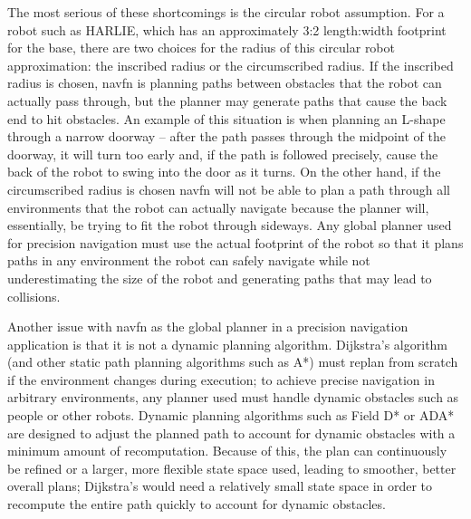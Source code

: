 The most serious of these shortcomings is the circular robot assumption. For a robot such as HARLIE, which has an approximately 3:2 length:width footprint for the base, there are two choices for the radius of this circular robot approximation: the inscribed radius or the circumscribed radius. If the inscribed radius is chosen, navfn is planning paths between obstacles that the robot can actually pass through, but the planner may generate paths that cause the back end to hit obstacles. An example of this situation is when planning an L-shape through a narrow doorway -- after the path passes through the midpoint of the doorway, it will turn too early and, if the path is followed precisely, cause the back of the robot to swing into the door as it turns. On the other hand, if the circumscribed radius is chosen navfn will not be able to plan a path through all environments that the robot can actually navigate because the planner will, essentially, be trying to fit the robot through sideways. Any global planner used for precision navigation must use the actual footprint of the robot so that it plans paths in any environment the robot can safely navigate while not underestimating the size of the robot and generating paths that may lead to collisions.

Another issue with navfn as the global planner in a precision navigation application is that it is not a dynamic planning algorithm. Dijkstra's algorithm (and other static path planning algorithms such as A*) must replan from scratch if the environment changes during execution; to achieve precise navigation in arbitrary environments, any planner used must handle dynamic obstacles such as people or other robots. Dynamic planning algorithms such as Field D* \autocite{FieldDStar} or ADA* \autocites{ADAStar}{DBLP:journals/ai/LikhachevFGST08} are designed to adjust the planned path to account for dynamic obstacles with a minimum amount of recomputation. Because of this, the plan can continuously be refined or a larger, more flexible state space used, leading to smoother, better overall plans; Dijkstra's would need a relatively small state space in order to recompute the entire path quickly to account for dynamic obstacles.

